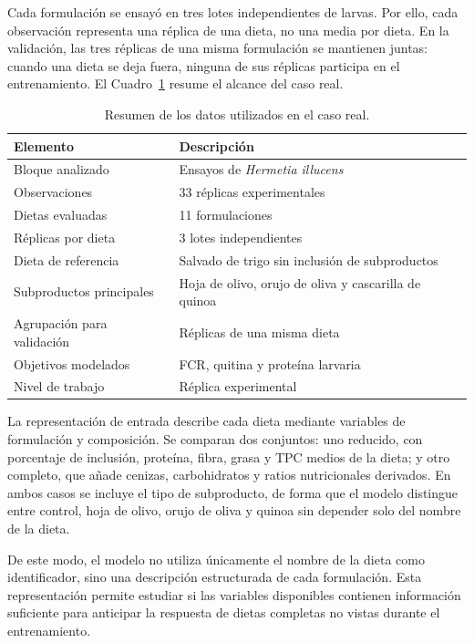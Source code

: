 Cada formulación se ensayó en tres lotes independientes de larvas. Por ello, cada observación representa una réplica de una dieta, no una media por dieta. En la validación, las tres réplicas de una misma formulación se mantienen juntas: cuando una dieta se deja fuera, ninguna de sus réplicas participa en el entrenamiento. El Cuadro~\ref{tab:dataset_caso_real} resume el alcance del caso real.

\begin{table}[htbp]
    \centering
    \small
    \caption[Datos del caso real]{Resumen de los datos utilizados en el caso real.}
    \label{tab:dataset_caso_real}
    \renewcommand{\arraystretch}{1.12}
    \begin{tabular}{ll}
        \toprule
        \textbf{Elemento} & \textbf{Descripción} \\
        \midrule
        Bloque analizado & Ensayos de \textit{Hermetia illucens} \\
        Observaciones & 33 réplicas experimentales \\
        Dietas evaluadas & 11 formulaciones \\
        Réplicas por dieta & 3 lotes independientes \\
        Dieta de referencia & Salvado de trigo sin inclusión de subproductos \\
        Subproductos principales & Hoja de olivo, orujo de oliva y cascarilla de quinoa \\
        Agrupación para validación & Réplicas de una misma dieta \\
        Objetivos modelados & FCR, quitina y proteína larvaria \\
        Nivel de trabajo & Réplica experimental \\
        \bottomrule
    \end{tabular}
\end{table}

La representación de entrada describe cada dieta mediante variables de formulación y composición. Se comparan dos conjuntos: uno reducido, con porcentaje de inclusión, proteína, fibra, grasa y TPC medios de la dieta; y otro completo, que añade cenizas, carbohidratos y ratios nutricionales derivados. En ambos casos se incluye el tipo de subproducto, de forma que el modelo distingue entre control, hoja de olivo, orujo de oliva y quinoa sin depender solo del nombre de la dieta.

De este modo, el modelo no utiliza únicamente el nombre de la dieta como identificador, sino una descripción estructurada de cada formulación. Esta representación permite estudiar si las variables disponibles contienen información suficiente para anticipar la respuesta de dietas completas no vistas durante el entrenamiento.

